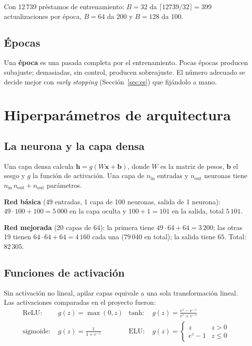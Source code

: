 \documentclass[11pt,a4paper]{article}
\begin{document}
\begin{ejemplo}
Con 12\,739 préstamos de entrenamiento: $B=32$ da $\lceil12739/32\rceil=399$ actualizaciones por época, $B=64$ da 200 y $B=128$ da 100.
\end{ejemplo}

\subsection{Épocas}

Una \textbf{época} es una pasada completa por el entrenamiento. Pocas épocas producen subajuste; demasiadas, sin control, producen sobreajuste. El número adecuado se decide mejor con \textit{early stopping} (Sección~\ref{sec:es}) que fijándolo a mano.

\section{Hiperparámetros de arquitectura}

\subsection{La neurona y la capa densa}

Una capa densa calcula $\mathbf{h} = g(W\mathbf{x}+\mathbf{b})$, donde $W$ es la matriz de pesos, $\mathbf{b}$ el sesgo y $g$ la función de activación. Una capa de $n_{\text{in}}$ entradas y $n_{\text{out}}$ neuronas tiene $n_{\text{in}}\,n_{\text{out}} + n_{\text{out}}$ parámetros.

\begin{ejemplo}
\textbf{Red básica} (49 entradas, 1 capa de 100 neuronas, salida de 1 neurona):
$49\cdot100+100=5\,000$ en la capa oculta y $100+1=101$ en la salida, total $5\,101$.

\textbf{Red mejorada} (20 capas de 64): la primera tiene $49\cdot64+64=3\,200$; las otras 19 tienen $64\cdot64+64=4\,160$ cada una ($79\,040$ en total); la salida tiene $65$. Total: $82\,305$.
\end{ejemplo}

\subsection{Funciones de activación}

Sin activación no lineal, apilar capas equivale a una sola transformación lineal. Las activaciones comparadas en el proyecto fueron:
\begin{align*}
\text{ReLU: } & g(z)=\max(0,z) & \text{tanh: } & g(z)=\frac{e^z-e^{-z}}{e^z+e^{-z}}\\
\text{sigmoide: } & g(z)=\frac{1}{1+e^{-z}} & \text{ELU: } & g(z)=\begin{cases} z & z>0\\ e^{z}-1 & z\le0\end{cases}
\end{align*}
\end{document}
